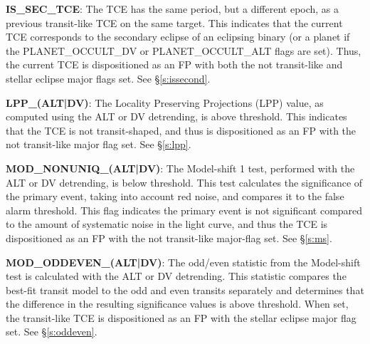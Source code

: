 \textbf{IS\_SEC\_TCE}: The TCE has the same period, but a different epoch, as a previous transit-like TCE on the same target. This indicates that the current TCE corresponds to the secondary eclipse of an eclipsing binary (or a planet if the PLANET\_OCCULT\_DV or PLANET\_OCCULT\_ALT flags are set). Thus, the current TCE is dispositioned as an FP with both the not transit-like and stellar eclipse major flags set. See \S\ref{s:issecond}.

\textbf{LPP\_(ALT|DV)}: The Locality Preserving Projections (LPP) value\citet{Thompson2015b}, as computed using the ALT or DV detrending, is above threshold. This indicates that the TCE is not transit-shaped, and thus is dispositioned as an FP with the not transit-like major flag set. See \S\ref{s:lpp}.


\textbf{MOD\_NONUNIQ\_(ALT|DV)}: The Model-shift 1 test, performed with the ALT or DV detrending, is below threshold. This test calculates the significance of the primary event, taking into account red noise, and compares it to the false alarm threshold. This flag indicates the primary event is not significant compared to the amount of systematic noise in the light curve, and thus the TCE is dispositioned as an FP with the not transit-like major-flag set. See \S\ref{s:ms}.


\textbf{MOD\_ODDEVEN\_(ALT|DV)}: The odd/even statistic from the Model-shift test is calculated with the ALT or DV detrending. This statistic compares the best-fit transit model to the odd and even transits separately and determines that the difference in the resulting significance values is above threshold. When set, the transit-like TCE is dispositioned as an FP with the stellar eclipse major flag set. See \S\ref{s:oddeven}.

